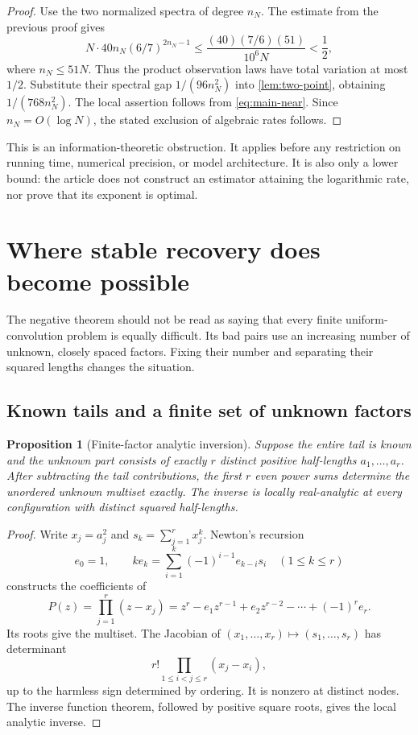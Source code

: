 \documentclass[11pt,a4paper]{article}
\newtheorem{proposition}[theorem]{Proposition}
\theoremstyle{definition}
\theoremstyle{remark}
\begin{document}
\begin{proof}
Use the two normalized spectra of degree $n_N$. The estimate from the
previous proof gives
\[
 N\cdot40n_N(6/7)^{2n_N-1}
 \le\frac{(40)(7/6)(51)}{10^6N}<\frac12,
\]
where $n_N\le51N$. Thus the product observation laws have total
variation at most $1/2$. Substitute their spectral gap $1/(96n_N^2)$
into \cref{lem:two-point}, obtaining $1/(768n_N^2)$.
The local assertion follows from \eqref{eq:main-near}. Since
$n_N=O(\log N)$, the stated exclusion of algebraic rates follows.
\end{proof}

This is an information-theoretic obstruction. It applies before any
restriction on running time, numerical precision, or model architecture.
It is also only a lower bound: the article does not construct an estimator
attaining the logarithmic rate, nor prove that its exponent is optimal.

\section{Where stable recovery does become possible}
\label{sec:positive}

The negative theorem should not be read as saying that every finite
uniform-convolution problem is equally difficult. Its bad pairs use an
increasing number of unknown, closely spaced factors. Fixing their number
and separating their squared lengths changes the situation.

\subsection{Known tails and a finite set of unknown factors}

\begin{proposition}[Finite-factor analytic inversion]\label{prop:finite}
Suppose the entire tail is known and the unknown part consists of exactly
$r$ distinct positive half-lengths $a_1,\ldots,a_r$. After subtracting
the tail contributions, the first $r$ even power sums determine the
unordered unknown multiset exactly. The inverse is locally real-analytic
at every configuration with distinct squared half-lengths.
\end{proposition}

\begin{proof}
Write $x_j=a_j^2$ and $s_k=\sum_{j=1}^r x_j^k$. Newton's recursion
\[
 e_0=1,\qquad
 k e_k=\sum_{i=1}^k(-1)^{i-1}e_{k-i}s_i\quad(1\le k\le r)
\]
constructs the coefficients of
\[
 P(z)=\prod_{j=1}^r(z-x_j)
     =z^r-e_1z^{r-1}+e_2z^{r-2}-\cdots+(-1)^re_r.
\]
Its roots give the multiset. The Jacobian of
$(x_1,\ldots,x_r)\mapsto(s_1,\ldots,s_r)$ has determinant
\[
 r!\prod_{1\le i<j\le r}(x_j-x_i),
\]
up to the harmless sign determined by ordering. It is nonzero at distinct
nodes. The inverse function theorem, followed by positive square roots,
gives the local analytic inverse.
\end{proof}
\end{document}
